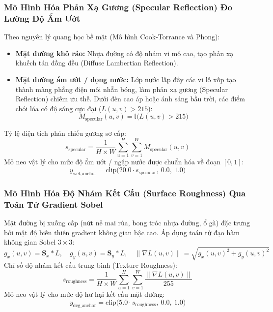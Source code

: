 \documentclass[11pt,a4paper]{article}
\begin{document}
\subsubsection{Mô Hình Hóa Phản Xạ Gương (Specular Reflection) Đo Lường Độ Ẩm Ướt}
Theo nguyên lý quang học bề mặt (Mô hình Cook-Torrance và Phong):
\begin{itemize}
    \item \textbf{Mặt đường khô ráo:} Nhựa đường có độ nhám vi mô cao, tạo phản xạ khuếch tán đồng đều (Diffuse Lambertian Reflection).
    \item \textbf{Mặt đường ẩm ướt / đọng nước:} Lớp nước lấp đầy các vi lỗ xốp tạo thành màng phẳng điện môi nhẵn bóng, làm phản xạ gương (Specular Reflection) chiếm ưu thế. Dưới đèn cao áp hoặc ánh sáng bầu trời, các điểm chói lóa có độ sáng cực đại ($L(u, v) > 215$):
    \begin{equation}
        M_{\text{specular}}(u, v) = \mathbb{I}\big(L(u, v) > 215\big)
    \end{equation}
\end{itemize}
Tỷ lệ diện tích phản chiếu gương sơ cấp:
\begin{equation}
    s_{\text{specular}} = \frac{1}{H \times W} \sum_{u=1}^H \sum_{v=1}^W M_{\text{specular}}(u, v)
\end{equation}
Mỏ neo vật lý cho mức độ ẩm ướt / ngập nước được chuẩn hóa về đoạn $[0, 1]$:
\begin{equation}
    y_{\text{wet\_anchor}} = \text{clip}\big(20.0 \cdot s_{\text{specular}}, \ 0.0, \ 1.0\big)
\end{equation}

\subsubsection{Mô Hình Hóa Độ Nhám Kết Cấu (Surface Roughness) Qua Toán Tử Gradient Sobel}
Mặt đường bị xuống cấp (nứt nẻ mai rùa, bong tróc nhựa đường, ổ gà) đặc trưng bởi mật độ biến thiên gradient không gian bậc cao. Áp dụng toán tử đạo hàm không gian Sobel $3 \times 3$:
\begin{equation}
    g_x(u, v) = \mathbf{S}_x * L, \quad g_y(u, v) = \mathbf{S}_y * L, \quad \|\nabla L(u, v)\| = \sqrt{g_x(u, v)^2 + g_y(u, v)^2}
\end{equation}
Chỉ số độ nhám kết cấu trung bình (Texture Roughness):
\begin{equation}
    s_{\text{roughness}} = \frac{1}{H \times W} \sum_{u=1}^H \sum_{v=1}^W \frac{\|\nabla L(u, v)\|}{255}
\end{equation}
Mỏ neo vật lý cho mức độ hư hại kết cấu mặt đường:
\begin{equation}
    y_{\text{deg\_anchor}} = \text{clip}\big(5.0 \cdot s_{\text{roughness}}, \ 0.0, \ 1.0\big)
\end{equation}
\end{document}
